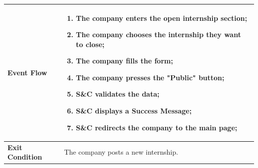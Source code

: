 \begin{enumerate}[label=\textbf{[US\arabic*]}, left = 0pt, align = left, resume]
\begin{longtable}{|l|p{11cm}|}
                \textbf{Event Flow} &
                    \begin{enumerate}[label=\arabic*., itemsep=0.2em]
                        \item The company enters the open internship section;
                        \item The company chooses the internship they want to close;
                        \item The company fills the form;
                        \item The company presses the "Public" button;
                        \item S\&C validates the data;
                        \item S\&C displays a Success Message;
                        \item S\&C redirects the company to the main page;
                    \end{enumerate} \\
                \hline
                
                \textbf{Exit Condition} & 
                    The company posts a new internship. \\
                \hline
                

\end{longtable}
\end{enumerate}

